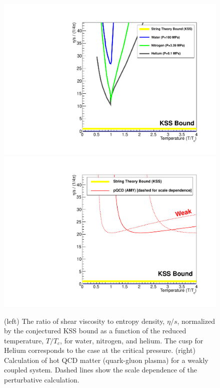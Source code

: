 \begin{figure}[t]
 \begin{center}
    \includegraphics[trim = 2 2 2 2, clip, width=\twowidth]{figs/figure_physicscase_etaovers_liquids}
    \hfill
    \includegraphics[trim = 2 2 2 2, clip, width=\twowidth]{figs/figure_physicscase_etaovers_qgpweak}
    \caption[$\eta/s$ vs $T/T_{c}$ for water, nitrogen, and
    helium]{(left) The ratio of shear viscosity to entropy density,
      $\eta/s$, normalized by the conjectured KSS bound as a function
      of the reduced temperature, $T/T_{c}$, for water, nitrogen, and
      helium. The cusp for Helium corresponds to the case at the
      critical pressure.  (right) Calculation of hot QCD matter
      (quark-gluon plasma) for a weakly coupled system.  Dashed lines
      show the scale dependence of the perturbative calculation.}
    \label{fig:etaovers_1}
 \end{center}
\end{figure}

